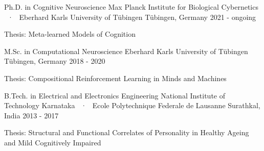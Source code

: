 \begin{cventries}
\vspace{5mm}
  \cventryEd
    {Ph.D. in Cognitive Neuroscience} %
    {Max Planck Institute for Biological Cybernetics  ~·~ Eberhard Karls University of Tübingen} %
    {}
    {Tübingen, Germany} %
    {2021 - ongoing} %
  {\begin{cvitems} \item Thesis: Meta-learned Models of Cognition %
  \end{cvitems}}

  \cventryEd
    {M.Sc. in Computational Neuroscience} %
    {Eberhard Karls University of Tübingen} %
    {}
    {Tübingen, Germany} %
    {2018 - 2020} %
  {\begin{cvitems} \item Thesis: Compositional Reinforcement Learning in Minds and Machines %
  \end{cvitems}}


  \cventryEd
    {B.Tech.  in Electrical and Electronics Engineering} %
    {National Institute of Technology Karnataka ~·~ Ecole Polytechnique Federale de Lausanne} %
    {}
    {Surathkal, India} %
    {2013 - 2017} %
    {\begin{cvitems}\item Thesis: Structural and Functional Correlates of Personality in Healthy Ageing and Mild Cognitively Impaired
    \end{cvitems}}

\end{cventries}